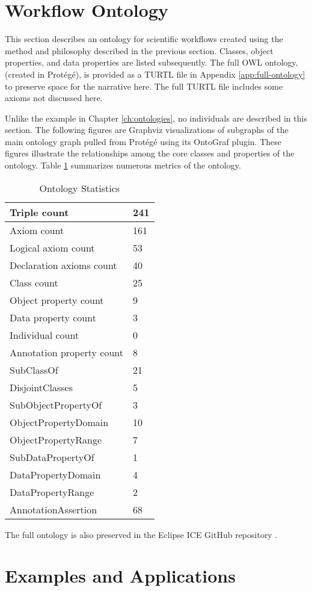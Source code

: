 \section{Workflow Ontology}
\label{workflow-ont-section}

This section describes an ontology for scientific workflows created using the
method and philosophy described in the previous section. Classes, object
properties, and data properties are listed subsequently. The full OWL ontology,
(created in Prot\'eg\'e), is provided as a TURTL file in Appendix
\ref{app:full-ontology} to preserve space for the narrative here. The full
TURTL file includes some axioms not discussed here. 

Unlike the example in Chapter \ref{ch:ontologies}, no individuals are described
in this section. The following figures are Graphviz visualizations
of subgraphs of the main ontology graph pulled from Prot\'eg\'e using its OntoGraf
plugin. These figures illustrate the relationships among the core classes and
properties of the ontology. Table \ref{ont-stats-table} summarizes numerous
metrics of the ontology.

\begin{table}[H]
\begin{tabularx}{\textwidth}{|X|X|}
\hline
Triple count & 241 \tabularnewline\hline
Axiom count	& 161	\tabularnewline\hline
Logical axiom count	& 53	\tabularnewline\hline
Declaration axioms count &	40	\tabularnewline\hline
Class count	& 25	\tabularnewline\hline
Object property count	& 9	\tabularnewline\hline
Data property count	& 3	\tabularnewline\hline
Individual count &	0	\tabularnewline\hline
Annotation property count	& 8 \tabularnewline\hline
SubClassOf	& 21		\tabularnewline\hline
DisjointClasses  &	5 \tabularnewline\hline
SubObjectPropertyOf	& 3 \tabularnewline\hline
ObjectPropertyDomain &	10	\tabularnewline\hline
ObjectPropertyRange	& 7 \tabularnewline\hline
SubDataPropertyOf	& 1 \tabularnewline\hline
DataPropertyDomain	& 4	\tabularnewline\hline
DataPropertyRange &	2 \tabularnewline\hline
AnnotationAssertion	& 68 \tabularnewline\hline
\end{tabularx}
\caption{Ontology Statistics}
\label{ont-stats-table}
\end{table}

The full ontology is also preserved in the Eclipse ICE GitHub repository
\cite{eclipse-ice-github}.


\section{Examples and Applications}
\label{workflow-ont-examples}

